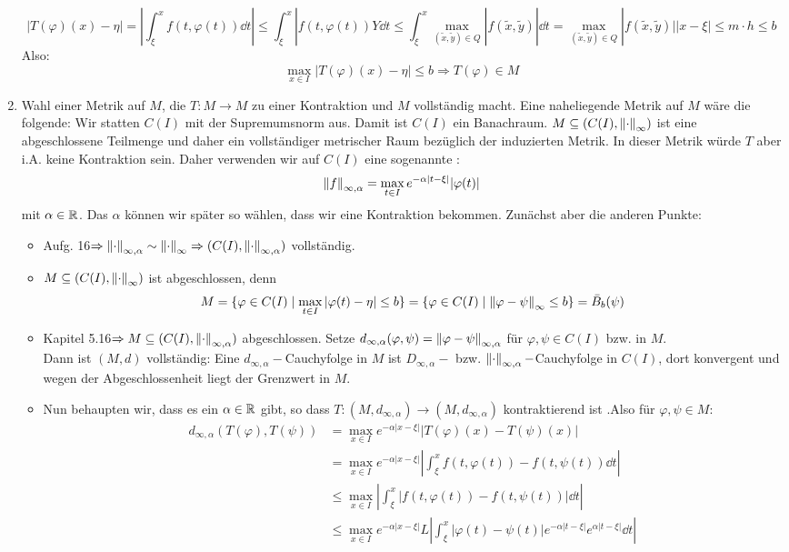 \begin{beweis}
\begin{enumerate}
		\[ |T(\varphi)(x)-\eta|=\left|\int_{\xi}^{x}f(t,\varphi(t))\dd t\right|\leq\int_{\xi}^{x}|f(t,\varphi(t))Y\dd t\leq\int_{\xi}^{x}\max_{(\tilde x,\tilde y)\in Q}|f(\tilde x,\tilde y)|\dd t=\max_{(\tilde x,\tilde y)\in Q}|f(\tilde x,\tilde y)||x-\xi|\leq m\cdot h\leq b \]
		Also:
		\[ \max_{x\in I}|T(\varphi)(x)-\eta|\leq b\Rightarrow T(\varphi)\in M \]
		\item Wahl einer Metrik auf $ M $, die $ T\colon M\rightarrow M $ zu einer Kontraktion und $ M $ vollst\"andig macht. Eine naheliegende Metrik auf $ M $ w\"are die folgende: Wir statten $ C(I) $ mit der Supremumsnorm aus. Damit ist $ C(I) $ ein Banachraum. $ M\subseteq(C(I),\left\|\cdot\right\|_\infty) $ ist eine abgeschlossene Teilmenge und daher ein vollst\"andiger metrischer Raum bez\"uglich der induzierten Metrik. In dieser Metrik w\"urde $ T $ aber i.A. keine Kontraktion sein. Daher verwenden wir auf $ C(I) $ eine sogenannte :
		\[ \left\|f\right\|_{\infty,\alpha}=\max_{t\in I}e^{-\alpha|t-\xi|}|\varphi(t)| \]
		mit $ \alpha\in\mathbb{R} $. Das $ \alpha $ k\"onnen wir sp\"ater so w\"ahlen, dass wir eine Kontraktion bekommen. Zun\"achst aber die anderen Punkte:
		\begin{itemize}
			\item Aufg. 16$ \Rightarrow\left\|\cdot\right\|_{\infty,\alpha}\sim\left\|\cdot\right\|_\infty\Rightarrow (C(I),\left\|\cdot\right\|_{\infty,\alpha}) $ vollst\"andig.
			\item $ M\subseteq(C(I),\left\|\cdot\right\|_\infty) $ ist abgeschlossen, denn
			\[ M=\lbrace \varphi\in C(I)\mid\max_{t\in I}|\varphi(t)-\eta|\leq b\rbrace=\lbrace \varphi\in C(I)\mid\left\|\varphi-\psi\right\|_{\infty}\leq b\rbrace=\bar B_b(\psi) \]
			\item Kapitel 5.16$ \Rightarrow M\subseteq (C(I),\left\|\cdot\right\|_{\infty,\alpha}) $ abgeschlossen. Setze $ d_{\infty,\alpha}(\varphi,\psi)=\left\|\varphi-\psi\right\|_{\infty,\alpha} $ f\"ur $ \varphi,\psi\in C(I) $ bzw. in $ M $.\\
	        Dann ist $ (M,d) $ vollst\"andig: Eine $ d_{\infty,\alpha}- $Cauchyfolge in $ M $ ist $ D_{\infty,\alpha}- $ bzw. $ \left\|\cdot\right\|_{\infty,\alpha} -$Cauchyfolge in $ C(I) $, dort konvergent und wegen der Abgeschlossenheit liegt der Grenzwert in $ M $.
	        \item Nun behaupten wir, dass es ein $ \alpha\in\mathbb{R} $ gibt, so dass $ T\colon (M,d_{\infty,\alpha})\rightarrow (M,d_{\infty,\alpha}) $ kontraktierend ist .Also f\"ur $ \varphi,\psi\in M $:
	        \begin{align*}
	        d_{\infty,\alpha}(T(\varphi),T(\psi))&=\max_{x\in I}e^{-\alpha|x-\xi|}|T(\varphi)(x)-T(\psi)(x)|\\&=\max_{x\in I}e^{-\alpha|x-\xi|}\left|\int_{\xi}^{x}f(t,\varphi(t))-f(t,\psi(t))\dd t\right|\\&\leq\max_{x\in I}\left|\int_{\xi}^{x}|f(t,\varphi(t))-f(t,\psi(t))|\dd t\right|\\&\leq\max_{x\in I}e^{-\alpha|x-\xi|}L\left|\int_{\xi}^{x}|\varphi(t)-\psi(t)|e^{-\alpha|t-\xi|}e^{\alpha|t-\xi|}\dd t\right|\\

\end{align*}
\end{itemize}
\end{enumerate}
\end{beweis}
